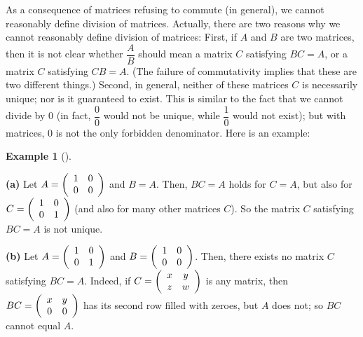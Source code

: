\documentclass[numbers=enddot,12pt,final,onecolumn,notitlepage]{scrartcl}%
\theoremstyle{definition}
\newtheorem{exam}[theo]{Example}
\newenvironment{example}[1][]
{\begin{exam}[#1]\begin{leftbar}}
{\end{leftbar}\end{exam}}
\begin{document}
As a consequence of matrices refusing to commute (in general), we cannot
reasonably define division of matrices. Actually, there are two reasons why we
cannot reasonably define division of matrices: First, if $A$ and $B$ are two
matrices, then it is not clear whether $\dfrac{A}{B}$ should mean a matrix $C$
satisfying $BC=A$, or a matrix $C$ satisfying $CB=A$. (The failure of
commutativity implies that these are two different things.) Second, in
general, neither of these matrices $C$ is necessarily unique; nor is it
guaranteed to exist. This is similar to the fact that we cannot divide by $0$
(in fact, $\dfrac{0}{0}$ would not be unique, while $\dfrac{1}{0}$ would not
exist); but with matrices, $0$ is not the only forbidden denominator. Here is
an example:

\begin{example}
\textbf{(a)} Let $A=\left(
\begin{array}
[c]{cc}%
1 & 0\\
0 & 0
\end{array}
\right)  $ and $B=A$. Then, $BC=A$ holds for $C=A$, but also for $C=\left(
\begin{array}
[c]{cc}%
1 & 0\\
0 & 1
\end{array}
\right)  $ (and also for many other matrices $C$). So the matrix $C$
satisfying $BC=A$ is not unique.

\textbf{(b)} Let $A=\left(
\begin{array}
[c]{cc}%
1 & 0\\
0 & 1
\end{array}
\right)  $ and $B=\left(
\begin{array}
[c]{cc}%
1 & 0\\
0 & 0
\end{array}
\right)  $. Then, there exists no matrix $C$ satisfying $BC=A$. Indeed, if
$C=\left(
\begin{array}
[c]{cc}%
x & y\\
z & w
\end{array}
\right)  $ is any matrix, then $BC=\left(
\begin{array}
[c]{cc}%
x & y\\
0 & 0
\end{array}
\right)  $ has its second row filled with zeroes, but $A$ does not; so $BC$
cannot equal $A$.
\end{example}
\end{document}
